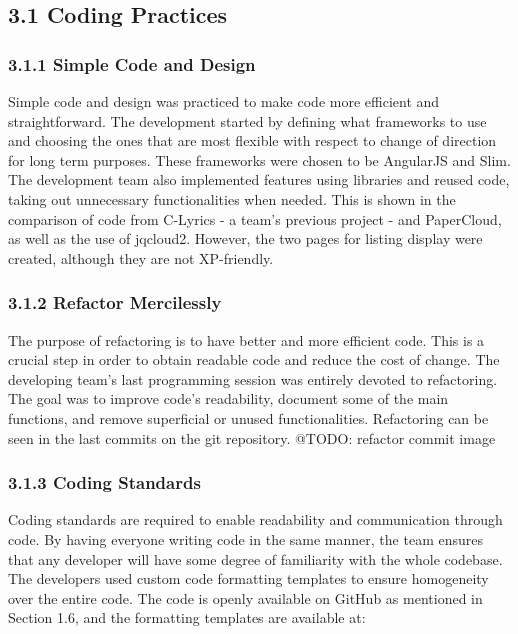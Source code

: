 \documentclass[]{article}
\begin{document}
\subsection{3.1 Coding Practices}\label{coding-practices}

\subsubsection{3.1.1 Simple Code and
Design}\label{simple-code-and-design}

Simple code and design was practiced to make code more efficient and
straightforward. The development started by defining what frameworks to
use and choosing the ones that are most flexible with respect to change
of direction for long term purposes. These frameworks were chosen to be
AngularJS and Slim. The development team also implemented features using
libraries and reused code, taking out unnecessary functionalities when
needed. This is shown in the comparison of code from C-Lyrics - a team's
previous project - and PaperCloud, as well as the use of jqcloud2.
However, the two pages for listing display were created, although they
are not XP-friendly.

\subsubsection{3.1.2 Refactor Mercilessly}\label{refactor-mercilessly}

The purpose of refactoring is to have better and more efficient code.
This is a crucial step in order to obtain readable code and reduce the
cost of change. The developing team's last programming session was
entirely devoted to refactoring. The goal was to improve code's
readability, document some of the main functions, and remove superficial
or unused functionalities. Refactoring can be seen in the last commits
on the git repository. @TODO: refactor commit image

\subsubsection{3.1.3 Coding Standards}\label{coding-standards}

Coding standards are required to enable readability and communication
through code. By having everyone writing code in the same manner, the
team ensures that any developer will have some degree of familiarity
with the whole codebase. The developers used custom code formatting
templates to ensure homogeneity over the entire code. The code is openly
available on GitHub as mentioned in Section 1.6, and the formatting
templates are available at:
\end{document}
